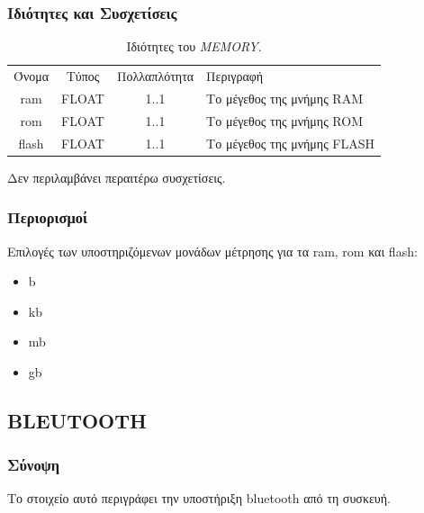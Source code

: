 \subsubsection*{Ιδιότητες και Συσχετίσεις}

\begin{table}[H]
	\begin{center}
		\begin{tabular}{ | c | c | c| m{5.5cm} | }
			\hline
			\rowcolor{Gray}
			\multicolumn{4}{|c|}{\textbf{Ιδιότητες}}\\
			\hline
			\rowcolor{Gray}
			Όνομα & Τύπος & Πολλαπλότητα & Περιγραφή \\
			\hline
			ram & FLOAT & 1..1 & Το μέγεθος της μνήμης RAM \\
			\hline
			rom & FLOAT & 1..1 & Το μέγεθος της μνήμης ROM \\
			\hline
			flash & FLOAT & 1..1 & Το μέγεθος της μνήμης FLASH \\
			\hline
		\end{tabular}
		\caption{Ιδιότητες του \textit{MEMORY}.}
		\label{tab:memory}
	\end{center}
\end{table}

\noindent Δεν περιλαμβάνει περαιτέρω συσχετίσεις.

\subsubsection*{Περιορισμοί}

\noindent Επιλογές των υποστηριζόμενων μονάδων μέτρησης για τα ram, rom και flash:

\begin{itemize}
	\item b
	\item kb
	\item mb
	\item gb
\end{itemize}

\subsection{BLEUTOOTH}
\label{subsec:bluetooth}

\subsubsection*{Σύνοψη}

\noindent Το στοιχείο αυτό περιγράφει την υποστήριξη bluetooth από τη συσκευή.

